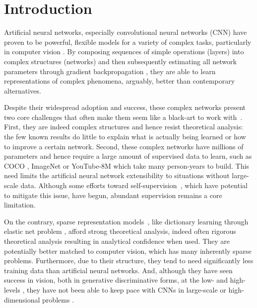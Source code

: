 \documentclass[10pt,twocolumn,letterpaper]{article}
\begin{document}
\section{Introduction}

Artificial neural networks, especially convolutional neural networks (CNN) \cite{LeBoBeIEEE1998} have proven to be powerful, flexible models \cite{HeZhReCVPR2016,SiZiICLR2015,KrSuHiNIPS2012} for a variety of complex tasks, particularly in computer vision \cite{RuDeSuIJCV2015,JoKaFeCVPR2016,OhGuLeNIPS2015}. By composing sequences of simple operations (layers) into complex structures (networks) and then subsequently estimating all network parameters through gradient backpropagation \cite{lecun2012efficient}, they are able to learn representations of complex phenomena, arguably, better than contemporary alternatives.

Despite their widespread adoption and success, these complex networks present 
two core challenges that often make them seem like a black-art to work 
with~\cite{orr2003neural,NgYoClCVPR2015}.  First, they are indeed complex 
structures and hence resist theoretical analysis: the few known results 
\cite{hornik1989multilayer,MaSIAMJC1997} do little to explain what is actually 
being learned or how to improve a certain network.  Second, these complex 
networks have millions of parameters and hence require a large amount of 
supervised data to learn, such as COCO \cite{LiMaBeECCV2014}, ImageNet 
\cite{DeDoSoCVPR2009} or YouTube-8M \cite{youtube8m} which take many 
person-years to build.  This need limits the artificial neural network 
extensibility to situations without large-scale data.  Although some efforts 
toward self-supervision~\cite{Vondrick_2016_CVPR}, which have potential to 
mitigate this issue, have begun, abundant supervision remains a core 
limitation.

On the contrary, sparse representation models~\cite{ElBOOK2010}, like 
dictionary learning through elastic net problem \cite{ZoHaJRSS2005}, afford 
strong theoretical analysis, indeed often rigorous theoretical analysis 
resulting in analytical confidence when used.  They are potentially better 
matched to computer vision, which has many inherently sparse problems.  
Furthermore, due to their structure, they tend to need significantly less training 
data than artificial neural networks.  And, although they have seen success in 
vision, both in generative \cite{YuLiLaCVPR2011} discriminative 
\cite{zhang2010discriminative} forms, at the low- \cite{mairal2008sparse} and 
high-levels \cite{luo2013group}, they have not been able to keep pace with CNNs 
in large-scale or high-dimensional problems \cite{RuDeSuIJCV2015}.
\end{document}
